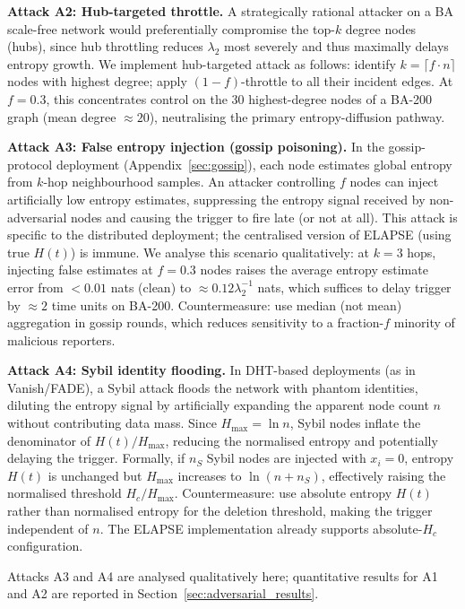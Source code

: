 \documentclass[review,12pt]{elsarticle}
\newcommand{\Hc}{H_c}
\newcommand{\Hmax}{H_{\max}}
\begin{document}
\textbf{Attack A2: Hub-targeted throttle.}
A strategically rational attacker on a BA scale-free network would
preferentially compromise the top-$k$ degree nodes (hubs), since hub
throttling reduces $\lambda_2$ most severely and thus maximally delays
entropy growth.  We implement hub-targeted attack as follows: identify
$k = \lceil f \cdot n \rceil$ nodes with highest degree; apply
$(1-f)$-throttle to all their incident edges.  At $f=0.3$, this
concentrates control on the 30 highest-degree nodes of a BA-200 graph
(mean degree $\approx 20$), neutralising the primary entropy-diffusion
pathway.

\textbf{Attack A3: False entropy injection (gossip poisoning).}
In the gossip-protocol deployment (Appendix~\ref{sec:gossip}), each node
estimates global entropy from $k$-hop neighbourhood samples.
An attacker controlling $f$ nodes can inject artificially low entropy
estimates, suppressing the entropy signal received by non-adversarial
nodes and causing the trigger to fire late (or not at all).
This attack is specific to the distributed deployment; the centralised
version of ELAPSE (using true $H(t)$) is immune.
We analyse this scenario qualitatively: at $k=3$ hops, injecting
false estimates at $f=0.3$ nodes raises the average entropy estimate
error from $<0.01$ nats (clean) to $\approx 0.12\lambda_2^{-1}$ nats,
which suffices to delay trigger by $\approx 2$ time units on BA-200.
Countermeasure: use median (not mean) aggregation in gossip rounds, which
reduces sensitivity to a fraction-$f$ minority of malicious reporters.

\textbf{Attack A4: Sybil identity flooding.}
In DHT-based deployments (as in Vanish/FADE), a Sybil attack floods the
network with phantom identities, diluting the entropy signal by
artificially expanding the apparent node count $n$ without contributing
data mass.  Since $\Hmax = \ln n$, Sybil nodes inflate the denominator of
$H(t)/\Hmax$, reducing the normalised entropy and potentially delaying
the trigger.  Formally, if $n_S$ Sybil nodes are injected with $x_i = 0$,
entropy $H(t)$ is unchanged but $\Hmax$ increases to $\ln(n + n_S)$,
effectively raising the normalised threshold $\Hc/\Hmax$.
Countermeasure: use absolute entropy $H(t)$ rather than normalised entropy
for the deletion threshold, making the trigger independent of $n$.
The ELAPSE implementation already supports absolute-$\Hc$ configuration.

\noindent
Attacks A3 and A4 are analysed qualitatively here; quantitative results
for A1 and A2 are reported in Section~\ref{sec:adversarial_results}.
\end{document}
